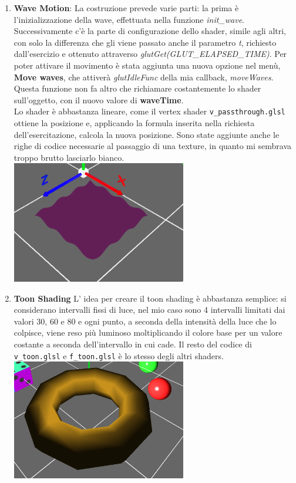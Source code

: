 \begin{enumerate}
    \item \textbf{Wave Motion}: La costruzione prevede varie parti: la prima è l'inizializzazione della wave, effettuata nella funzione \textit{init\_wave}. Successivamente c'è la parte di configurazione dello shader, simile agli altri, con solo la differenza che gli viene passato anche il parametro \textit{t}, richiesto dall'esercizio e ottenuto attraverso \textit{glutGet(GLUT\_ELAPSED\_TIME)}. Per poter attivare il movimento è stata aggiunta una nuova opzione nel menù, \textbf{Move waves}, che attiverà \textit{glutIdleFunc} della mia callback, \textit{moveWaves}. Questa funzione non fa altro che richiamare costantemente lo shader sull'oggetto, con il nuovo valore di \textbf{waveTime}.\\ Lo shader è abbastanza lineare, come il vertex shader \texttt{v\_passthrough.glsl} ottiene la posizione e, applicando la formula inserita nella richiesta dell'esercitazione, calcola la nuova posizione. Sono state aggiunte anche le righe di codice necessarie al passaggio di una texture, in quanto mi sembrava troppo brutto lasciarlo bianco.\\
        {\centering
\includegraphics[width=0.6\textwidth]{wave.png}}
    \item \textbf{Toon Shading} L' idea per creare il toon shading è abbastanza semplice: si considerano intervalli fissi di luce, nel mio caso sono 4 intervalli limitati dai valori 30, 60 e 80 e ogni punto, a seconda della intensità della luce che lo colpisce, viene reso più luminoso moltiplicando il colore base per un valore costante a seconda dell'intervallo in cui cade. Il resto del codice di  \texttt{v\_toon.glsl} e \texttt{f\_toon.glsl}  è lo stesso degli altri shaders. \\
    {\centering
\includegraphics[width=0.6\textwidth]{toroToon.png}}

\end{enumerate}
